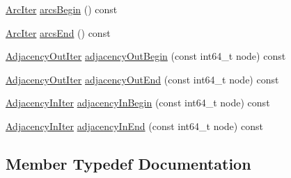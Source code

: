 \begin{DoxyCompactItemize}
\item 
\hyperlink{classnifty_1_1graph_1_1SimpleDirectedGraph_ad555ff3a9746915c60858cd7d55ae342}{Arc\+Iter} \hyperlink{classnifty_1_1graph_1_1SimpleDirectedGraph_af40cd92a29a3edda8299c681595c8f97}{arcs\+Begin} () const 
\item 
\hyperlink{classnifty_1_1graph_1_1SimpleDirectedGraph_ad555ff3a9746915c60858cd7d55ae342}{Arc\+Iter} \hyperlink{classnifty_1_1graph_1_1SimpleDirectedGraph_aaea9d1ee2612ce1dd24464583b27ccd1}{arcs\+End} () const 
\item 
\hyperlink{classnifty_1_1graph_1_1SimpleDirectedGraph_a5af7a4eb6bbc44b805a44bb131786dd0}{Adjacency\+Out\+Iter} \hyperlink{classnifty_1_1graph_1_1SimpleDirectedGraph_a192481eeb7c7f00e424b5394e9bd0817}{adjacency\+Out\+Begin} (const int64\+\_\+t node) const 
\item 
\hyperlink{classnifty_1_1graph_1_1SimpleDirectedGraph_a5af7a4eb6bbc44b805a44bb131786dd0}{Adjacency\+Out\+Iter} \hyperlink{classnifty_1_1graph_1_1SimpleDirectedGraph_ab8a11a50925097bc5a1461c0fb4b5e71}{adjacency\+Out\+End} (const int64\+\_\+t node) const 
\item 
\hyperlink{classnifty_1_1graph_1_1SimpleDirectedGraph_aaf7f58391a2b6e0db7983462dbd6a542}{Adjacency\+In\+Iter} \hyperlink{classnifty_1_1graph_1_1SimpleDirectedGraph_a9586d07efd7e65d8e0fd133ee2184af4}{adjacency\+In\+Begin} (const int64\+\_\+t node) const 
\item 
\hyperlink{classnifty_1_1graph_1_1SimpleDirectedGraph_aaf7f58391a2b6e0db7983462dbd6a542}{Adjacency\+In\+Iter} \hyperlink{classnifty_1_1graph_1_1SimpleDirectedGraph_a3340106e7d4de3ca6f4e7bf8a4b6c279}{adjacency\+In\+End} (const int64\+\_\+t node) const 
\end{DoxyCompactItemize}


\subsection{Member Typedef Documentation}
\hypertarget{classnifty_1_1graph_1_1SimpleDirectedGraph_aaf7f58391a2b6e0db7983462dbd6a542}{}
